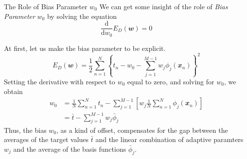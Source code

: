 \documentclass{bredelebeamer}
\begin{document}
\begin{frame}{The Role of Bias Parameter $w_0$}
  We can get some insight of the role of \textit{Bias Parameter} $w_0$ by solving
  the equation
  \begin{equation}
    \frac{\mathrm{d}}{\mathrm{d}w_0} E_D(\mathbfit{w}) = 0
  \end{equation}

  At first, let us make the bias parameter to be explicit.
  \begin{equation}
    E_{D}(\mathbfit{w}) = \frac{1}{2} \sum_{n=1}^{N} { \left\{ t_n - w_0 - \sum_{j=1}^{M-1} w_j \phi_j (\mathbfit{x}_n)\right\}}^2
  \end{equation}
  Setting the derivative with respect to $w_0$ equal to zero, and solving for
  $w_0$, we obtain
  \begin{equation}
    \begin{split}
      w_0
      &= \frac{1}{N} \sum_{n=1}^{N} t_n - \sum_{j=1}^{M-1} [w_j \frac{1}{N} \sum_{n=1}^{N}\phi_j (\mathbfit{x}_n)] \\
      &= \bar{t} - \sum_{j=1}^{M-1} w_j \bar{\phi}_j
    \end{split}
  \end{equation}
  Thus, the bias $w_0$, as a kind of offset, compensates for the gap between
  the averages of the target values $\bar{t}$ and the linear combination of adaptive
  paramters $w_j$ and the average of the basis functions $\bar{\phi}_j$.
\end{frame}
\end{document}
